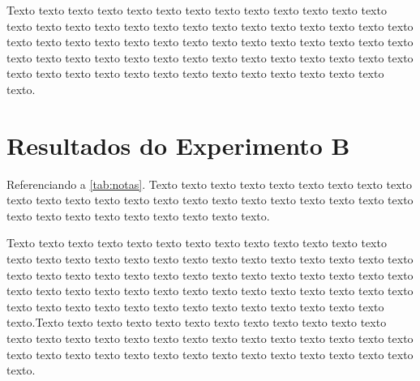 Texto texto texto texto texto texto texto texto texto texto texto texto texto texto texto texto texto texto texto texto texto texto texto texto texto texto texto texto texto texto texto texto texto texto texto texto texto texto texto texto texto texto texto texto texto texto texto texto texto texto texto texto texto texto texto texto texto texto texto texto texto texto texto texto texto texto texto texto texto.

\section{Resultados do Experimento B}
\label{sec:resultados-do-experimento-b}

Referenciando a \autoref{tab:notas}. Texto texto texto texto texto texto texto texto texto texto texto texto texto texto texto texto texto texto texto texto texto texto texto texto texto texto texto texto texto texto texto texto.

\begin{table}[!ht]	
	\captionsetup{width=11.3cm}%
\end{table}

Texto texto texto texto texto texto texto texto texto texto texto texto texto texto texto texto texto texto texto texto texto texto texto texto texto texto texto texto texto texto texto texto texto texto texto texto texto texto texto texto texto texto texto texto texto texto texto texto texto texto texto texto texto texto texto texto texto texto texto texto texto texto texto texto texto texto texto texto texto.Texto texto texto texto texto texto texto texto texto texto texto texto texto texto texto texto texto texto texto texto texto texto texto texto texto texto texto texto texto texto texto texto texto texto texto texto texto texto texto texto texto.


